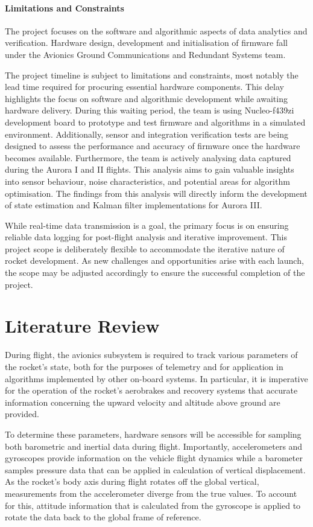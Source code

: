 \paragraph{Limitations and Constraints}
The project focuses on the software and algorithmic aspects of data analytics and verification. Hardware design, development and initialisation of firmware fall under the Avionics Ground Communications and Redundant Systems team. 

The project timeline is subject to limitations and constraints, most notably the lead time required for procuring essential hardware components. This delay highlights the focus on software and algorithmic development while awaiting hardware delivery. During this waiting period, the team is using Nucleo-f439zi development board to prototype and test firmware and algorithms in a simulated environment. Additionally, sensor and integration verification tests are being designed to assess the performance and accuracy of firmware once the hardware becomes available. Furthermore, the team is actively analysing data captured during the Aurora I and II flights. This analysis aims to gain valuable insights into sensor behaviour, noise characteristics, and potential areas for algorithm optimisation. The findings from this analysis will directly inform the development of state estimation and Kalman filter implementations for Aurora III. 

While real-time data transmission is a goal, the primary focus is on ensuring reliable data logging for post-flight analysis and iterative improvement. This project scope is deliberately flexible to accommodate the iterative nature of rocket development. As new challenges and opportunities arise with each launch, the scope may be adjusted accordingly to ensure the successful completion of the project. 

\section{Literature Review}
During flight, the avionics subsystem is required to track various parameters of the rocket's state, both for the purposes of telemetry and for application in algorithms implemented by other on-board systems. In particular, it is imperative for the operation of the rocket's aerobrakes and recovery systems that accurate information concerning the upward velocity and altitude above ground are provided.

To determine these parameters, hardware sensors will be accessible for sampling both barometric and inertial data during flight. Importantly, accelerometers and gyroscopes provide information on the vehicle flight dynamics while a barometer samples pressure data that can be applied in calculation of vertical displacement. As the rocket's body axis during flight rotates off the global vertical, measurements from the accelerometer diverge from the true values. To account for this, attitude information that is calculated from the gyroscope is applied to rotate the data back to the global frame of reference.

